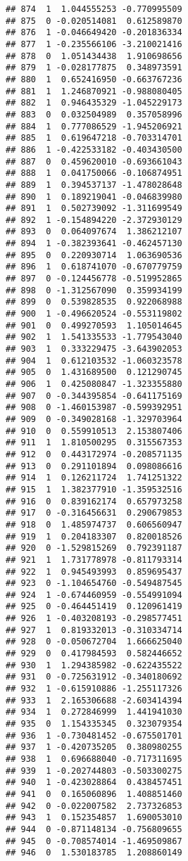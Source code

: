 \documentclass[
]{article}
\begin{document}
\begin{verbatim}
## 874  1  1.044555253 -0.770995509
## 875  0 -0.020514081  0.612589870
## 876  1 -0.046649420 -0.201836334
## 877  1 -0.235566106 -3.210021416
## 878  0  1.051434438  1.910698656
## 879  1 -0.028177875  0.348973591
## 880  1  0.652416950 -0.663767236
## 881  1  1.246870921 -0.988080405
## 882  1  0.946435329 -1.045229173
## 883  0  0.032504989  0.357058996
## 884  1  0.777086529 -1.945206921
## 885  1  0.619647218 -0.703314701
## 886  1 -0.422533182 -0.403430500
## 887  0  0.459620010 -0.693661043
## 888  1  0.041750066 -0.106874951
## 889  1  0.394537137 -1.478028648
## 890  1  0.189219041 -0.046839980
## 891  1  0.502739092 -1.311699549
## 892  1 -0.154894220 -2.372930129
## 893  0  0.064097674  1.386212107
## 894  1 -0.382393641 -0.462457130
## 895  0  0.220930714  1.063690536
## 896  1  0.618741070 -0.670779759
## 897  0 -0.124456778 -0.519952865
## 898  0 -1.312567090  0.359934199
## 899  0  0.539828535  0.922068988
## 900  1 -0.496620524 -0.553119802
## 901  0  0.499270593  1.105014645
## 902  1  1.541335533 -1.779543040
## 903  1  0.333229475 -3.643902053
## 904  1  0.612103532 -1.060323578
## 905  0  1.431689500  0.121290745
## 906  1  0.425080847 -1.323355880
## 907  0 -0.344395854 -0.641175169
## 908  0 -1.460153987 -0.599392951
## 909  0 -0.349028168 -1.329703964
## 910  0  0.559910513  2.153807406
## 911  1  1.810500295  0.315567353
## 912  0  0.443172974 -0.208571135
## 913  0  0.291101894  0.098086616
## 914  1  0.126211724  1.741251322
## 915  1  1.382377910 -1.359532516
## 916  0  0.839162174  0.657973258
## 917  0 -0.316456631  0.290679853
## 918  0  1.485974737  0.606560947
## 919  1  0.204183307  0.820018526
## 920  0 -1.529815269  0.792391187
## 921  1  1.731778978 -0.811793314
## 922  1  0.945493993  0.859695437
## 923  0 -1.104654760 -0.549487545
## 924  1 -0.674460959 -0.554991094
## 925  0 -0.464451419  0.120961419
## 926  1 -0.403208193 -0.298577451
## 927  1  0.819332013 -0.310334714
## 928  0 -0.050672704  1.666625040
## 929  0  0.417984593  0.582446652
## 930  1  1.294385982 -0.622435522
## 931  0 -0.725631912 -0.340180692
## 932  1 -0.615910886 -1.255117326
## 933  1  2.165306688 -2.603414394
## 934  1  0.272846999  1.441941030
## 935  0  1.154335345  0.323079354
## 936  1 -0.730481452 -0.675501701
## 937  1 -0.420735205  0.380980255
## 938  1  0.696688040 -0.717311695
## 939  1 -0.202744803 -0.503300275
## 940  1 -0.423028864  0.438457451
## 941  0  0.165060896  1.408851460
## 942  0 -0.022007582  2.737326853
## 943  1  0.152354857  1.690053010
## 944  0 -0.871148134 -0.756809655
## 945  0 -0.708574014 -1.469509867
## 946  0  1.530183785  1.208860149

\end{verbatim}
\end{document}

